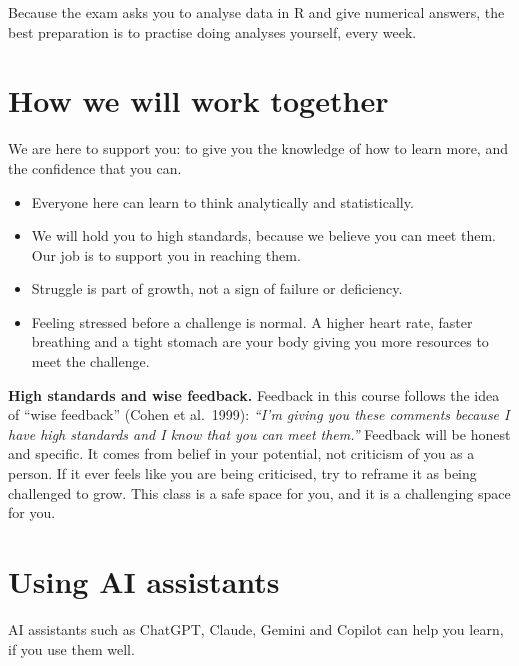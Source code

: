 \documentclass[
  letterpaper,
  8pt,
  a4paper]{book}
\providecommand{\tightlist}{%
  \setlength{\itemsep}{0pt}\setlength{\parskip}{0pt}}
\begin{document}
Because the exam asks you to analyse data in R and give numerical
answers, the best preparation is to practise doing analyses yourself,
every week.

\section*{How we will work together}\label{how-we-will-work-together}


We are here to support you: to give you the knowledge of how to learn
more, and the confidence that you can.

\begin{itemize}
\tightlist
\item
  Everyone here can learn to think analytically and statistically.
\item
  We will hold you to high standards, because we believe you can meet
  them. Our job is to support you in reaching them.
\item
  Struggle is part of growth, not a sign of failure or deficiency.
\item
  Feeling stressed before a challenge is normal. A higher heart rate,
  faster breathing and a tight stomach are your body giving you more
  resources to meet the challenge.
\end{itemize}

\textbf{High standards and wise feedback.} Feedback in this course
follows the idea of ``wise feedback'' (Cohen et al.~1999): \emph{``I'm
giving you these comments because I have high standards and I know that
you can meet them.''} Feedback will be honest and specific. It comes
from belief in your potential, not criticism of you as a person. If it
ever feels like you are being criticised, try to reframe it as being
challenged to grow. This class is a safe space for you, and it is a
challenging space for you.

\section*{Using AI assistants}\label{using-ai-assistants}


AI assistants such as ChatGPT, Claude, Gemini and Copilot can help you
learn, if you use them well.
\end{document}
